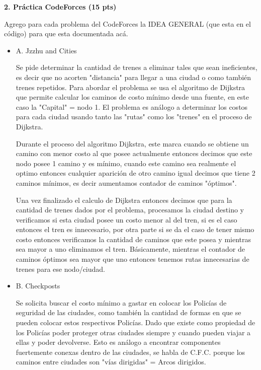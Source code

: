 \documentclass[a4paper,12pt]{article}
\begin{document}
\textbf{2. Práctica CodeForces (15 pts)}

Agrego para cada problema del CodeForces la IDEA GENERAL (que esta en el código) para que esta documentada acá.

\begin{itemize}

\item A. Jzzhu and Cities

Se pide determinar la cantidad de trenes a eliminar tales que sean ineficientes, es decir que no acorten "distancia" para llegar a una ciudad o como también trenes repetidos. Para abordar el problema se usa el algoritmo de Dijkstra que permite calcular los caminos de costo mínimo desde una fuente, en este caso la "Capital" = nodo 1. El problema es análogo a determinar los costos para cada ciudad usando tanto las "rutas" como los "trenes" en el proceso de Dijkstra.

Durante el proceso del algoritmo Dijkstra, este marca cuando se obtiene un camino con menor costo al que posee actualmente entonces decimos que este nodo posee 1 camino y es mínimo, cuando este camino sea realmente el optimo entonces cualquier aparición de otro camino igual decimos que tiene 2 caminos mínimos, es decir aumentamos contador de caminos "óptimos".

Una vez finalizado el calculo de Dijkstra entonces decimos que para la cantidad de trenes dados por el problema, procesamos la ciudad destino y verificamos si esta ciudad posee un costo menor al del tren, si es el caso entonces el tren es innecesario, por otra parte si se da el caso de tener mismo costo entonces verificamos la cantidad de caminos que este posea y mientras sea mayor a uno eliminamos el tren. Básicamente, mientras el contador de caminos óptimos sea mayor que uno entonces tenemos rutas innecesarias de trenes para ese nodo/ciudad.

\item B. Checkposts

Se solicita buscar el costo mínimo a gastar en colocar los Policías de seguridad de las ciudades, como también la cantidad de formas en que se pueden colocar estos respectivos Policías. Dado que existe como propiedad de los Policías poder proteger otras ciudades siempre y cuando pueden viajar a ellas y poder devolverse. Esto es análogo a encontrar componentes fuertemente conexas dentro de las ciudades, se habla de C.F.C. porque los caminos entre ciudades son "vías dirigidas" = Arcos dirigidos. 


\end{itemize}
\end{document}
